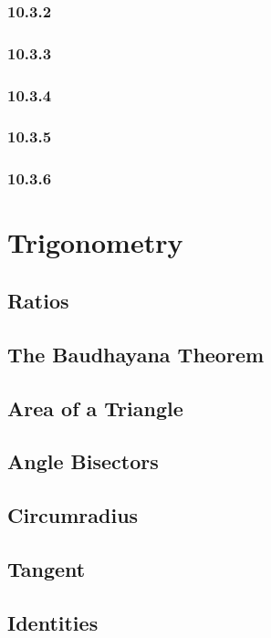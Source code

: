 \documentclass[11pt]{book}
\begin{document}
\subsection{10.3.2}

\subsection{10.3.3}

\subsection{10.3.4}

\subsection{10.3.5}

\subsection{10.3.6}

\chapter{Trigonometry}
\section{Ratios}

\section{The Baudhayana Theorem}

%
\section{Area of a Triangle}

\section{Angle Bisectors}

\section{Circumradius}

\section{Tangent}

\section{Identities}

\end{document}
